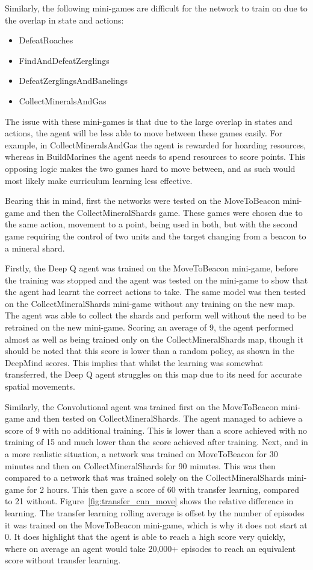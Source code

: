 Similarly, the following mini-games are difficult for the network to train on
due to the overlap in state and actions:

\begin{itemize}
    \item DefeatRoaches
    \item FindAndDefeatZerglings
    \item DefeatZerglingsAndBanelings
    \item CollectMineralsAndGas
\end{itemize}

The issue with these mini-games is that due to the large overlap in states and
actions, the agent will be less able to move between these games easily. For
example, in CollectMineralsAndGas the agent is rewarded for hoarding resources,
whereas in BuildMarines the agent needs to spend resources to score points. This
opposing logic makes the two games hard to move between, and as such would most
likely make curriculum learning less effective.

Bearing this in mind, first the networks were tested on the MoveToBeacon
mini-game and then the CollectMineralShards game. These games were chosen due to
the same action, movement to a point, being used in both, but with the second
game requiring the control of two units and the target changing from a beacon to
a mineral shard.

Firstly, the Deep Q agent was trained on the MoveToBeacon mini-game, before the
training was stopped and the agent was tested on the mini-game to show that the
agent had learnt the correct actions to take. The same model was then tested on
the CollectMineralShards mini-game without any training on the new map. The
agent was able to collect the shards and perform well without the need to be
retrained on the new mini-game. Scoring an average of 9, the agent performed
almost as well as being trained only on the CollectMineralShards map, though it
should be noted that this score is lower than a random policy, as shown in the
DeepMind scores. This implies that whilst the learning was somewhat transferred,
the Deep Q agent struggles on this map due to its need for accurate spatial
movements.

Similarly, the Convolutional agent was trained first on the MoveToBeacon
mini-game and then tested on CollectMineralShards. The agent managed to achieve
a score of 9 with no additional training. This is lower than a score achieved
with no training of 15 and much lower than the score achieved after training.
Next, and in a more realistic situation, a network was trained on MoveToBeacon
for 30 minutes and then on CollectMineralShards for 90 minutes. This was then
compared to a network that was trained solely on the CollectMineralShards
mini-game for 2 hours. This then gave a score of 60 with transfer learning,
compared to 21 without. Figure~\ref{fig:transfer_cnn_move} shows the relative
difference in learning. The transfer learning rolling average is offset by the
number of episodes it was trained on the MoveToBeacon mini-game, which is why it
does not start at 0. It does highlight that the agent is able to reach a high
score very quickly, where on average an agent would take 20,000+ episodes to
reach an equivalent score without transfer learning.

